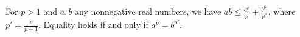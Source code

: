 For $p > 1$ and $a, b$ any nonnegative real numbers, we have $ab \leq \frac{a^p}{p} + \frac{b^{p'}}{p'}$, where $p' = \frac{p}{p-1}$. Equality holds if and only if $a^p = b^{p'}$.
